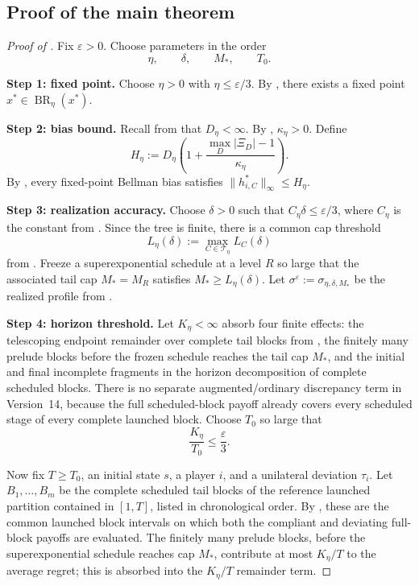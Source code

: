 \documentclass[12pt]{article}
\theoremstyle{definition}
\newcommand{\eps}{\varepsilon}
\newcommand{\1}{\mathbf{1}}
\newcommand{\cT}{\mathcal{T}}
\DeclareMathOperator{\BR}{BR}
\begin{document}
\subsection{Proof of the main theorem}




\begin{proof}[Proof of ]
Fix $\eps>0$. Choose parameters in the order
\[
\eta,\qquad \delta,\qquad M_*,\qquad T_0.
\]

\smallskip
\noindent\textbf{Step 1: fixed point.}
Choose $\eta>0$ with $\eta\le \eps/3$. By
, there exists a fixed point $x^*\in\BR_\eta(x^*)$.

\smallskip
\noindent\textbf{Step 2: bias bound.}
Recall from  that $D_\eta<\infty$. By
, $\kappa_\eta>0$. Define
\[
H_\eta:=D_\eta\left(1+\frac{\max_D|\Xi_D|-1}{\kappa_\eta}\right).
\]
By , every fixed-point Bellman bias satisfies
$\|h_{i,C}^*\|_\infty\le H_\eta$.

\smallskip
\noindent\textbf{Step 3: realization accuracy.}
Choose $\delta>0$ such that $C_\eta\delta\le \eps/3$, where $C_\eta$ is the
constant from . Since the tree is finite, there is a
common cap threshold
\[
L_\eta(\delta):=\max_{C\in\cT_\eta}L_C(\delta)
\]
from . Freeze a superexponential schedule at a level
$R$ so large that the associated tail cap $M_*=M_R$ satisfies
$M_*\ge L_\eta(\delta)$. Let
$\sigma^\eps:=\sigma_{\eta,\delta,M_*}$ be the realized profile from
.

\smallskip
\noindent\textbf{Step 4: horizon threshold.}
Let $K_\eta<\infty$ absorb four finite effects: the telescoping endpoint
remainder over complete tail blocks from , the finitely many
prelude blocks before the frozen schedule reaches the tail cap $M_*$, and the
initial and final incomplete fragments in the horizon decomposition of complete
scheduled blocks. There is no separate augmented/ordinary discrepancy term in
Version~14, because the full scheduled-block payoff already covers every
scheduled stage of every complete launched block.
Choose $T_0$ so large that
\[
\frac{K_\eta}{T_0}\le \frac{\eps}{3}.
\]

Now fix $T\ge T_0$, an initial state $s$, a player $i$, and a unilateral
deviation $\tau_i$. Let $B_1,\dots,B_m$ be the complete scheduled tail blocks of
the reference launched partition contained in $[1,T]$, listed in chronological
order. By , these are the common launched
block intervals on which both the compliant and deviating full-block payoffs are
evaluated. The finitely many prelude blocks, before the superexponential schedule
reaches cap $M_*$, contribute at most $K_\eta/T$ to the average regret; this is
absorbed into the $K_\eta/T$ remainder term.


\end{proof}
\end{document}
